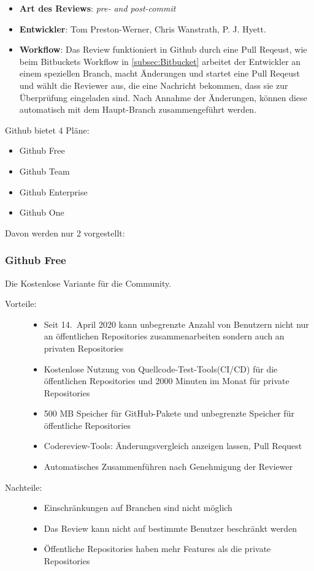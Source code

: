 \begin{itemize}
	\item \textbf{Art des Reviews}: \textit{pre- and post-commit}
	\item \textbf{Entwickler}: Tom Preston-Werner, Chris Wanstrath, P. J. Hyett.
	\item \textbf{Workflow}: Das Review funktioniert in Github durch eine Pull Reqeust, wie beim Bitbuckets Workflow in \cref{subsec:Bitbucket} arbeitet der Entwickler an einem
		speziellen Branch, macht Änderungen und startet eine Pull Reqeust und wählt die Reviewer aus, die eine Nachricht bekommen, dass sie zur Überprüfung eingeladen sind. Nach Annahme der
		Änderungen, können diese automatisch mit dem Haupt-Branch zusammengeführt werden.
\end{itemize}

Github bietet 4 Pläne:
\begin{itemize}
	\item Github Free
	\item Github Team
	\item Github Enterprise
	\item Github One
\end{itemize}
Davon werden nur 2 vorgestellt:

\subsubsection{Github Free}
\label{subsubsec:Free}

Die Kostenlose Variante für die Community.

\begin{description}
	\item [Vorteile:] \hfill
	\begin{itemize}
		\item Seit 14.~April 2020 kann unbegrenzte Anzahl von Benutzern nicht nur an öffentlichen Repositories zusammenarbeiten sondern auch an privaten Repositories
		\item Kostenlose Nutzung von Quellcode-Test-Tools(\ac{CI}/\ac{CD}) für die öffentlichen Repositories und 2000 Minuten im Monat für private Repositories
		\item 500 MB Speicher für GitHub-Pakete und unbegrenzte Speicher für öffentliche Repositories
		\item Codereview-Tools: Änderungsvergleich anzeigen lassen, Pull Request
		\item Automatisches Zusammenführen nach Genehmigung der Reviewer
	\end{itemize}
	
	\item [Nachteile:] \hfill
	\begin{itemize}
		\item Einschränkungen auf Branchen sind nicht möglich
		\item Das Review kann nicht auf bestimmte Benutzer beschränkt werden
		\item Öffentliche Repositories haben mehr Features als die private Repositories
	\end{itemize}
\end{description}

